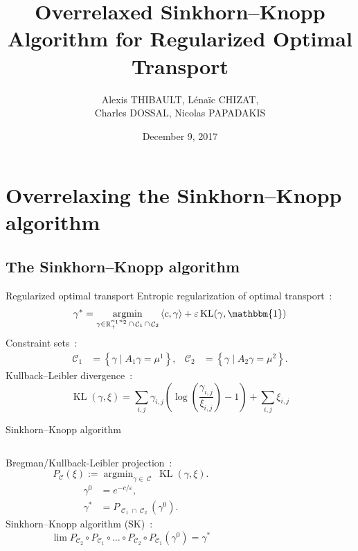 \documentclass{beamer}
\title[Overrelaxed Sinkhorn--Knopp]{Overrelaxed Sinkhorn--Knopp Algorithm for Regularized Optimal Transport}
\author[A. THIBAULT]{
	Alexis THIBAULT, 
	L\'ena\"ic CHIZAT,\\
	Charles DOSSAL,
	Nicolas PAPADAKIS
}
\institute[OTML'17]{Optimal Transport and Machine Learning workshop \\ NIPS 2017}
\date{December 9, 2017}
\newcommand{\scal}[2]{\left\langle #1 , #2 \right\rangle}
\DeclareMathOperator{\IR}{\mathbb{R}}
\DeclareMathOperator*{\argmin}{argmin}
\DeclareMathOperator{\One}{\mathbbm{1}}
\DeclareMathOperator{\Ccal}{\mathcal{C}}
\DeclareMathOperator{\KL}{KL}
\renewcommand{\epsilon}{\varepsilon}
\begin{document}
\titlepage

\begin{frame}
\tableofcontents
\end{frame}

\section[Overrelaxing SK]{Overrelaxing the Sinkhorn--Knopp algorithm}

\subsection[SK algorithm]{The Sinkhorn--Knopp algorithm}
\begin{frame}{Regularized optimal transport}
Entropic regularization of optimal transport~:
\[
\gamma^* = \argmin_{\gamma \in \IR^{n_1 n_2}_+ \cap \Ccal_1 \cap \Ccal_2}
	\scal{c}{\gamma} + \epsilon \KL(\gamma,\One)
\]
\pause
Constraint sets~:
\begin{align}
\Ccal_1 &= \left\{ \gamma \mid A_1 \gamma = \mu^1 \right\},
&
\Ccal_2 &= \left\{ \gamma \mid A_2 \gamma = \mu^2 \right\}.
\end{align}
\pause
Kullback--Leibler divergence~:
\begin{equation}\label{KL}
\KL(\gamma,\xi) = \sum_{i,j} \gamma_{i,j} \left( \log \left( \frac{\gamma_{i,j}}{\xi_{i,j}} \right) -1  \right) + \sum_{i,j} \xi_{i,j}
\end{equation}
\end{frame}


\begin{frame}{Sinkhorn--Knopp algorithm}
\begin{columns}
\begin{column}{0.6\textwidth}
	
Bregman/Kullback-Leibler projection~:
\[
P_{\Ccal}(\xi) := \argmin_{\gamma \in \Ccal} \KL(\gamma,\xi).
\]
\pause
\begin{align*}
\gamma^0 &= e^{-c/\epsilon},\\
\gamma^* &= P_{\Ccal_1 \cap \Ccal_2}(\gamma^0).
\end{align*}
\pause
Sinkhorn--Knopp algorithm (SK)~:
\[
\lim P_{\Ccal_2}\circ P_{\Ccal_1} \circ \ldots \circ P_{\Ccal_2} \circ P_{\Ccal_1} (\gamma^0) = \gamma^*
\]
\end{column}

\begin{column}{0.4\textwidth}
	\centering
	
\end{column}
\end{columns}
\end{frame}
\end{document}
